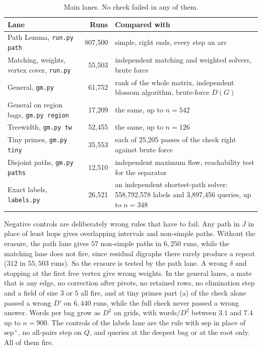 \documentclass[11pt]{article}
\theoremstyle{definition}
\theoremstyle{remark}
\theoremstyle{plain}
\newcommand{\sep}{\mathrm{sep}}
\begin{document}
\begin{table}[t]
\centering\small
\begin{tabular}{@{}p{5.4cm}rp{7.6cm}@{}}
\toprule
Lane & Runs & Compared with\\
\midrule
Path Lemma, \texttt{run.py path} & 807,500 & simple, right ends, every step an arc\\
Matching, weights, vertex cover, \texttt{run.py} & 55,503 & independent matching and weighted solvers, brute force\\
General, \texttt{gm.py} & 61,752 & rank of the whole matrix, independent blossom algorithm, brute-force $D(G)$\\
General on region bags, \texttt{gm.py region} & 17,209 & the same, up to $n=542$\\
Treewidth, \texttt{gm.py tw} & 52,455 & the same, up to $n=126$\\
Tiny primes, \texttt{gm.py tiny} & 35,553 & each of 25,205 passes of the check right against brute force\\
Disjoint paths, \texttt{gm.py paths} & 12,510 & independent maximum flow, reachability test for the separator\\
Exact labels, \texttt{labels.py} & 26,521 & an independent shortest-path solver: 558,792,578 labels and 3,897,456 queries, up to $n=348$\\
\bottomrule
\end{tabular}
\caption{Main lanes. No check failed in any of them.}
\label{tab:num}
\end{table}

Negative controls are deliberately wrong rules that have to fail. Any path in $J$ in place of least hops gives overlapping intervals and non-simple paths. Without the erasure, the path lane gives $57$ non-simple paths in $6{,}250$ runs, while the matching lane does not fire, since residual
digraphs there rarely produce a repeat ($312$ in $55{,}503$ runs). So the erasure is tested by the path lane. A wrong $\delta$ and stopping at the first free vertex give wrong weights. In the general lanes, a mate that is any edge, no correction after pivots, no retained rows, no elimination step and a field of
size $3$ or $5$ all fire, and at tiny primes part (a) of the check alone passed a wrong $D'$ on $6{,}440$ runs, while the full check never passed a wrong answer. Words per bag grow as $D^2$ on grids, with words$/D^2$ between $3.1$ and $7.4$ up to $n=900$. The controls of the labels lane are the rule with $\sep$ in place of $\sep^+$, no all-pairs step on $Q$, and queries at the deepest bag or at the root only. All of them fire.
\end{document}
